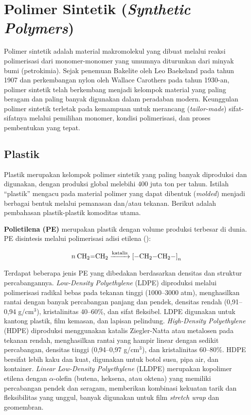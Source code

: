 \documentclass[12pt,a4paper,openany]{book}
\begin{document}
\section{Polimer Sintetik (\textit{Synthetic Polymers})}
\label{sec:polimer-sintetik}

Polimer sintetik adalah material makromolekul yang dibuat melalui reaksi polimerisasi dari monomer-monomer yang umumnya diturunkan dari minyak bumi (petrokimia). Sejak penemuan Bakelite oleh Leo Baekeland pada tahun 1907 dan perkembangan nylon oleh Wallace Carothers pada tahun 1930-an, polimer sintetik telah berkembang menjadi kelompok material yang paling beragam dan paling banyak digunakan dalam peradaban modern. Keunggulan polimer sintetik terletak pada kemampuan untuk merancang (\textit{tailor-made}) sifat-sifatnya melalui pemilihan monomer, kondisi polimerisasi, dan proses pembentukan yang tepat.

\subsection{Plastik}
\label{subsec:plastik}

Plastik merupakan kelompok polimer sintetik yang paling banyak diproduksi dan digunakan, dengan produksi global melebihi 400 juta ton per tahun. Istilah ``plastik'' mengacu pada material polimer yang dapat dibentuk (\textit{molded}) menjadi berbagai bentuk melalui pemanasan dan/atau tekanan. Berikut adalah pembahasan plastik-plastik komoditas utama.

\textbf{Polietilena (PE)} merupakan plastik dengan volume produksi terbesar di dunia. PE disintesis melalui polimerisasi adisi etilena ():

\begin{equation}
n\:\ce{CH2=CH2} \xrightarrow{\text{katalis}} \ce{[-CH2-CH2-]}_n
\end{equation}

Terdapat beberapa jenis PE yang dibedakan berdasarkan densitas dan struktur percabangannya. \textit{Low-Density Polyethylene} (LDPE) diproduksi melalui polimerisasi radikal bebas pada tekanan tinggi (1000--3000 atm), menghasilkan rantai dengan banyak percabangan panjang dan pendek, densitas rendah (0,91--0,94 g/cm$^3$), kristalinitas 40--60\%, dan sifat fleksibel. LDPE digunakan untuk kantong plastik, film kemasan, dan lapisan pelindung. \textit{High-Density Polyethylene} (HDPE) diproduksi menggunakan katalis Ziegler-Natta atau metalosen pada tekanan rendah, menghasilkan rantai yang hampir linear dengan sedikit percabangan, densitas tinggi (0,94--0,97 g/cm$^3$), dan kristalinitas 60--80\%. HDPE bersifat lebih kaku dan kuat, digunakan untuk botol susu, pipa air, dan kontainer. \textit{Linear Low-Density Polyethylene} (LLDPE) merupakan kopolimer etilena dengan $\alpha$-olefin (butena, heksena, atau oktena) yang memiliki percabangan pendek dan seragam, memberikan kombinasi kekuatan tarik dan fleksibilitas yang unggul, banyak digunakan untuk film \textit{stretch wrap} dan geomembran.
\end{document}

